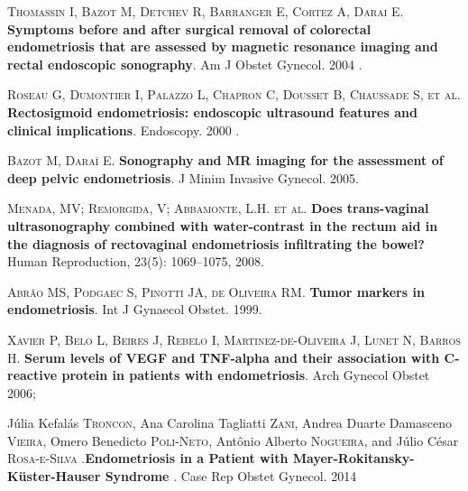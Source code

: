 \documentclass[12pt]{article} %
\begin{document}
\vspace{0,5cm}

\textsc{Thomassin I, Bazot M, Detchev R, Barranger E, Cortez A,
Darai E}.\textbf{ Symptoms before and after surgical removal of
colorectal endometriosis that are assessed by magnetic
resonance imaging and rectal endoscopic sonography}. Am J
Obstet Gynecol. 2004 .

\vspace{0,5cm}

\textsc{Roseau G, Dumontier I, Palazzo L, Chapron C, Dousset B,
Chaussade S, et al}.\textbf{ Rectosigmoid endometriosis: endoscopic
ultrasound features and clinical implications}. Endoscopy.
2000 .

\vspace{0,5cm}

\textsc{Bazot M, Daraï E}.\textbf{ Sonography and MR imaging for the
assessment of deep pelvic endometriosis}. J Minim Invasive
Gynecol. 2005.

\vspace{0,5cm}

\textsc{Menada, MV; Remorgida, V; Abbamonte, L.H. et al}.\textbf{ Does trans-vaginal ultrasonography combined with water-contrast in the rectum aid in the diagnosis of rectovaginal endometriosis infiltrating the bowel?} Human Reproduction, 23(5): 1069–1075, 2008.

\vspace{0,5cm}

\textsc{Abrão MS, Podgaec S, Pinotti JA, de Oliveira RM}. \textbf{Tumor markers
in endometriosis}. Int J Gynaecol Obstet. 1999.

\vspace{0,5cm}

\textsc{Xavier P, Belo L, Beires J, Rebelo I, Martinez-de-Oliveira J, Lunet N, Barros H}.
\textbf{Serum levels of VEGF and TNF-alpha and their association with C-reactive protein in patients with endometriosis}. Arch Gynecol Obstet 2006;

\vspace{0,5cm}

Júlia Kefalás\textsc{ Troncon}, Ana Carolina Tagliatti\textsc{ Zani}, Andrea Duarte Damasceno\textsc{ Vieira}, Omero Benedicto\textsc{ Poli-Neto}, Antônio Alberto \textsc{Nogueira}, and Júlio César\textsc{ Rosa-e-Silva} .\textbf{Endometriosis in a Patient with Mayer-Rokitansky-Küster-Hauser Syndrome} . Case Rep Obstet Gynecol. 2014

\vspace{0,5cm}
\end{document}
